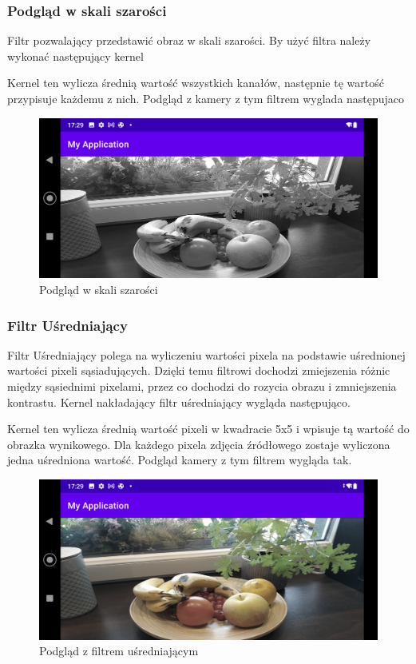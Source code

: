 \subsubsection[Podgląd w skali szarości]{Podgląd w skali szarości}
Filtr pozwalający przedstawić obraz w skali szarości. By użyć filtra należy wykonać następujący kernel

Kernel ten wylicza średnią wartość wszystkich kanałów, następnie tę wartość przypisuje każdemu z nich. Podgląd z kamery z tym filtrem wyglada następujaco
\begin{figure}[H]
	\includegraphics[scale=0.16]{imgs/BlackWhite.png}
	\caption{Podgląd w skali szarości}
\end{figure}
\subsubsection[Filtr Uśredniający]{Filtr Uśredniający}
Filtr Uśredniający polega na wyliczeniu wartości pixela na podstawie uśrednionej wartości pixeli sąsiadujących. Dzięki temu filtrowi dochodzi zmiejszenia różnic między sąsiednimi pixelami, przez co dochodzi do rozycia obrazu i zmniejszenia kontrastu. Kernel nakładający filtr uśredniający wygląda następująco.

Kernel ten wylicza średnią wartość pixeli w kwadracie 5x5 i wpisuje tą wartość do obrazka wynikowego. Dla każdego pixela zdjęcia źródłowego zostaje wyliczona jedna uśredniona wartość. Podgląd kamery z tym filtrem wygląda tak.
\begin{figure}[H]
	\includegraphics[scale=0.16]{imgs/avgFilter.png}
	\caption{Podgląd z filtrem uśredniającym}
\end{figure}
